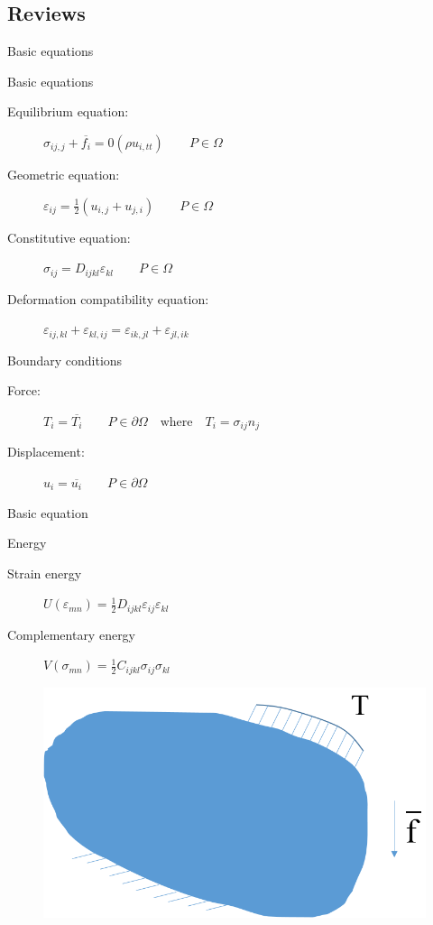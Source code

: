 \documentclass[11pt]{beamer}
\begin{document}
\subsection{Reviews}
\begin{frame}{Basic equations}
\begin{block}{Basic equations}
\begin{description}
\item[Equilibrium equation:] $\sigma_{ij,j}+\overline{f_i}=0(\rho u_{i,tt})\qquad P\in\Omega$
\item[Geometric equation:] $\varepsilon_{ij}=\frac{1}{2}(u_{i,j}+u_{j,i})\qquad P\in\Omega$
\item[Constitutive equation:] $\sigma_{ij}=D_{ijkl}\varepsilon_{kl}\qquad P\in\Omega$
\item[Deformation compatibility equation:] $\varepsilon_{ij,kl}+\varepsilon_{kl,ij}=\varepsilon_{ik,jl}+\varepsilon_{jl,ik}$
\end{description}
\end{block}
\begin{block}{Boundary conditions}
\begin{description}
\item[Force:] $T_i = \overline{T_i}\qquad P\in\partial\Omega \quad\text{where}\quad T_i = \sigma_{ij}n_j$
\item[Displacement:]$u_i = \overline{u_i}\qquad P\in\partial\Omega$
\end{description}
\end{block}
\end{frame}


\begin{frame}{Basic equation}
\begin{block}{Energy}
\begin{description}   
\item[Strain energy]$U(\varepsilon_{mn})=\frac{1}{2}D_{ijkl}\varepsilon_{ij}\varepsilon_{kl}$
\item[Complementary energy] $V(\sigma_{mn})=\frac{1}{2}C_{ijkl}\sigma_{ij}\sigma_{kl}$   
\end{description}
\end{block}
\begin{figure}
\centering
\includegraphics[width=0.7\linewidth]{source/general_elastic_body}
\end{figure}
\end{frame}
\end{document}
